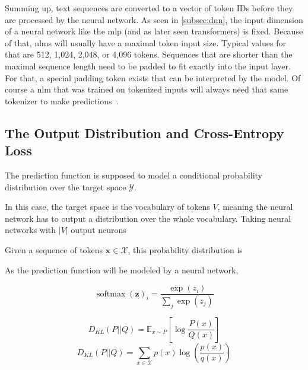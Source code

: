 Summing up, text sequences are converted to a vector of token IDs before they are processed by the neural network.
As seen in \autoref{subsec:dnn}, the input dimension of a neural network like the \gls{mlp} (and as later seen transformers) is fixed.
Because of that, \glspl{nlm} will usually have a maximal token input size.
Typical values for that are 512, 1,024, 2,048, or 4,096 tokens.
Sequences that are shorter than the maximal sequence length need to be padded to fit exactly into the input layer.
For that, a special padding token exists that can be interpreted by the model.
Of course a \gls{nlm} that was trained on tokenized inputs will always need that same tokenizer to make predictions~\autocite{transformer2022}.

\subsection{The Output Distribution and Cross-Entropy Loss}\label{subsec:the-output-distribution---cross-entropy-loss}


The prediction function is supposed to model a conditional probability distribution over the target space $\mathcal{Y}$.


In this case, the target space is the vocabulary of tokens $V$, meaning the neural network has to output a distribution over the whole vocabulary.
Taking neural networks with $|V|$ output neurons

Given a sequence of tokens $\boldsymbol{x} \in \mathcal{X}$, this probability distribution is

As the prediction function will be modeled by a neural network,



\[
    \operatorname{softmax}(\boldsymbol{z})_i = \frac{\exp (z_i)}{\sum_j \exp(z_j)}
\]

\[
    D_{KL} (P||Q) = \mathbb{E}_{x \sim P}[\log \frac{P(x)}{Q(x)}]
\]
\[
    D_{KL} (P||Q) = \sum_{x \in \mathcal{X}} p(x) \log(\frac{p(x)}{q(x)})
\]~\autocite{transformer2022}


